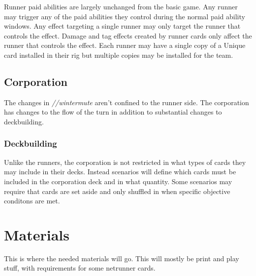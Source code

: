 \documentclass[titlepage]{article}
\begin{document}
Runner paid abilities are largely unchanged from the basic game. Any runner may trigger any of the paid abilities they control during the normal paid ability windows. Any effect targeting a single runner may only target the runner that controls the effect. Damage and tag effects created by runner cards only affect the runner that controls the effect. Each runner may have a single copy of a Unique card installed in their rig but multiple copies may be installed for the team.

\subsection{Corporation}

The changes in \emph{//wintermute} aren't confined to the runner side. The corporation has changes to the flow of the turn in addition to substantial changes to deckbuilding.

\subsubsection{Deckbuilding}

Unlike the runners, the corporation is not restricted in what types of cards they may include in their decks. Instead scenarios will define which cards must be included in the corporation deck and in what quantity. Some scenarios may require that cards are set aside and only shuffled in when specific objective conditons are met. 

\section{Materials}
This is where the needed materials will go. This will mostly be print and play stuff, with requirements for some netrunner cards.
\end{document}
